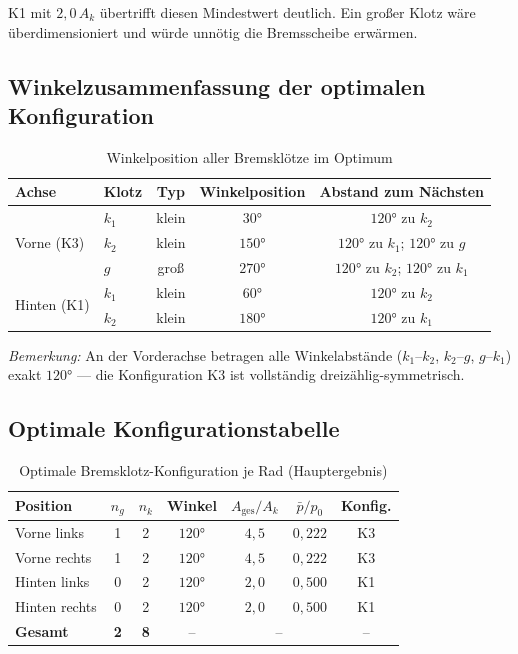 ﻿\documentclass[12pt,a4paper]{article}
\theoremstyle{definition}
\begin{document}
K1 mit $2{,}0\,A_k$ übertrifft diesen Mindestwert deutlich.  Ein großer
Klotz wäre überdimensioniert und würde unnötig die Bremsscheibe erwärmen.

\subsection{Winkelzusammenfassung der optimalen Konfiguration}

\begin{table}[H]
  \centering
  \caption{Winkelposition aller Bremsklötze im Optimum}
  \label{tab:winkel_opt}
  \renewcommand{\arraystretch}{1.5}
  \begin{tabular}{llccc}
    \toprule
    Achse & Klotz & Typ & Winkelposition & Abstand zum Nächsten \\
    \midrule
    \multirow{3}{*}{Vorne (K3)} & $k_1$ & klein & $30 °$  & $120 °$ zu $k_2$  \\
                                & $k_2$ & klein & $150 °$ & $120 °$ zu $k_1$; $120 °$ zu $g$ \\
                                & $g$   & groß  & $270 °$ & $120 °$ zu $k_2$; $120 °$ zu $k_1$ \\
    \midrule
    \multirow{2}{*}{Hinten (K1)} & $k_1$ & klein & $60 °$  & $120 °$ zu $k_2$ \\
                                 & $k_2$ & klein & $180 °$ & $120 °$ zu $k_1$ \\
    \bottomrule
  \end{tabular}
\end{table}

\noindent \textit{Bemerkung:} An der Vorderachse betragen alle
Winkelabstände ($k_1$--$k_2$, $k_2$--$g$, $g$--$k_1$) exakt $120 °$
--- die Konfiguration K3 ist vollständig dreizählig-symmetrisch.

\subsection{Optimale Konfigurationstabelle}

\begin{table}[H]
  \centering
  \caption{Optimale Bremsklotz-Konfiguration je Rad (Hauptergebnis)}
  \label{tab:optimal}
  \renewcommand{\arraystretch}{1.7}
  \begin{tabular}{lcccccc}
    \toprule
    \textbf{Position} & $n_g$ & $n_k$ & \textbf{Winkel} &
    $A_{\text{ges}}/A_k$ & $\bar{p}/p_0$ & \textbf{Konfig.} \\
    \midrule
    Vorne links  & 1 & 2 & $120 °$ & $4{,}5$ & $0{,}222$ & K3 \\
    Vorne rechts & 1 & 2 & $120 °$ & $4{,}5$ & $0{,}222$ & K3 \\
    Hinten links  & 0 & 2 & $120 °$ & $2{,}0$ & $0{,}500$ & K1 \\
    Hinten rechts & 0 & 2 & $120 °$ & $2{,}0$ & $0{,}500$ & K1 \\
    \midrule
    \textbf{Gesamt} & \textbf{2} & \textbf{8} & -- & \multicolumn{2}{c}{--} & -- \\
    \bottomrule
  \end{tabular}
\end{table}
\end{document}

